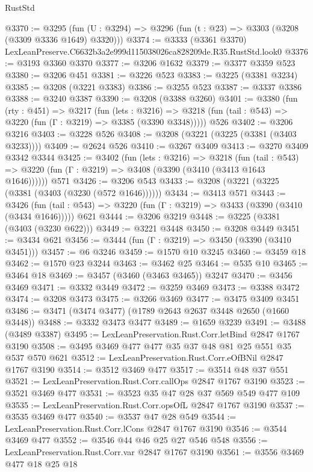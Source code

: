 \begin{lexlean}{RustStd}
\begin{coremodule}
@3370 := @3295 (fun (U : @3294) => @3296 (fun (t : @23) => @3303 (@3208 (@3309 @3336 @1649) @3320)))
@3374 := @3333 (@3361 @3370) LexLeanPreserve.C6632b3a2e999d115038026ca828209de.R35.RustStd.look0
@3376 := @3193 @3360 @3370
@3377 := @3206 @1632
@3379 := @3377 @3359 @523
@3380 := @3206 @451
@3381 := @3226 @523
@3383 := @3225 (@3381 @3234)
@3385 := @3208 (@3221 @3383)
@3386 := @3255 @523
@3387 := @3337 @3386
@3388 := @3240 @3387
@3390 := @3208 (@3388 @3260)
@3401 := @3380
    (fun (rty : @451) =>
    @3217
      (fun (lets : @3216) =>
      @3218 (fun (tail : @543) => @3220 (fun (Γ : @3219) => @3385 (@3390 @3348)))))
    @526
@3402 := @3206 @3216
@3403 := @3228 @526
@3408 := @3208 (@3221 (@3225 (@3381 (@3403 @3233))))
@3409 := @2624 @526
@3410 := @3267 @3409
@3413 := @3270 @3409 @3342 @3344
@3425 := @3402
    (fun (lets : @3216) =>
    @3218
      (fun (tail : @543) => @3220 (fun (Γ : @3219) => @3408 (@3390 (@3410 (@3413 @1643 @1646))))))
    @571
@3426 := @3206 @543
@3433 := @3208 (@3221 (@3225 (@3381 (@3403 (@3230 (@572 @1646))))))
@3434 := @3413 @571
@3443 := @3426
    (fun (tail : @543) => @3220 (fun (Γ : @3219) => @3433 (@3390 (@3410 (@3434 @1646)))))
    @621
@3444 := @3206 @3219
@3448 := @3225 (@3381 (@3403 (@3230 @622)))
@3449 := @3221 @3448
@3450 := @3208 @3449
@3451 := @3434 @621
@3456 := @3444 (fun (Γ : @3219) => @3450 (@3390 (@3410 @3451)))
@3457 := @6 @3246
@3459 := @1570 @10 @3245
@3460 := @3459 @18
@3462 := @1570 @23 @3244
@3463 := @3462 @25
@3464 := @535 @10
@3465 := @3464 @18
@3469 := @3457 (@3460 (@3463 @3465)) @3247
@3470 := @3456 @3469
@3471 := @3332 @3449
@3472 := @3259 @3469
@3473 := @3388 @3472
@3474 := @3208 @3473
@3475 := @3266 @3469
@3477 := @3475 @3409 @3451
@3486 := @3471 (@3474 @3477) (@1789 @2643 @2637 @3448 @2650 (@1660 @3448))
@3488 := @3332 @3473 @3477
@3489 := @1659 @3239
@3491 := @3488 (@3489 @3387)
@3495 := LexLeanPreservation.Rust.Corr.letBind @2847 @1767 @3190
@3508 := @3495 @3469 @477 @477 @35 @37 @48 @81 @25 @551 @35 @537 @570 @621
@3512 := LexLeanPreservation.Rust.Corr.eOfBNil @2847 @1767 @3190
@3514 := @3512 @3469 @477
@3517 := @3514 @48 @37 @551
@3521 := LexLeanPreservation.Rust.Corr.callOps @2847 @1767 @3190
@3523 := @3521 @3469 @477
@3531 := @3523 @35 @47 @28 @37 @569 @549 @477 @109
@3535 := LexLeanPreservation.Rust.Corr.opsOfL @2847 @1767 @3190
@3537 := @3535 @3469 @477
@3540 := @3537 @47 @28 @549
@3544 := LexLeanPreservation.Rust.Corr.lCons @2847 @1767 @3190
@3546 := @3544 @3469 @477
@3552 := @3546 @44 @46 @25 @27 @546 @548
@3556 := LexLeanPreservation.Rust.Corr.var @2847 @1767 @3190
@3561 := @3556 @3469 @477 @18 @25 @18

\end{coremodule}
\end{lexlean}
